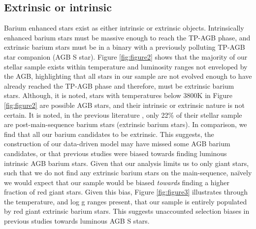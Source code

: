 \documentclass[a4paper,fleqn,usenatbib]{mnras}
\begin{document}
\subsection{Extrinsic or intrinsic}
Barium enhanced stars exist as either intrinsic or extrinsic objects. Intrinsically enhanced barium stars must be massive enough to reach the TP-AGB phase, and extrinsic barium stars must be in a binary with a previously polluting TP-AGB star companion (AGB S star). Figure \ref{fig:figure2} shows that the majority of our stellar sample exists within temperature and luminosity ranges not enveloped by the AGB, highlighting that all stars in our sample are not evolved enough to have already reached the TP-AGB phase and therefore, must be extrinsic barium stars. Although, it is noted, stars with temperatures below 3800K in Figure \ref{fig:figure2} are possible AGB stars, and their intrinsic or extrinsic nature is not certain. It is noted, in the previous literature \citep{van2017}, only 22\% of their stellar sample are post-main-sequence barium stars (extrinsic barium stars). In comparison, we find that all our barium candidates to be extrinsic. This suggests, the construction of our data-driven model may have missed some AGB barium candidates, or that previous studies were biased towards finding luminous intrinsic AGB barium stars. Given that our analysis limits us to only giant stars, such that we do not find any extrinsic barium stars on the main-sequence, na\"ively we would expect that our sample would be biased \emph{towards} finding a higher fraction of red giant stars. Given this bias, Figure \ref{fig:figure3} illustrates through the temperature, and log g ranges present, that our sample is entirely populated by red giant extrinsic barium stars. This suggests unaccounted selection biases in previous studies towards luminous AGB S stars.
\end{document}
